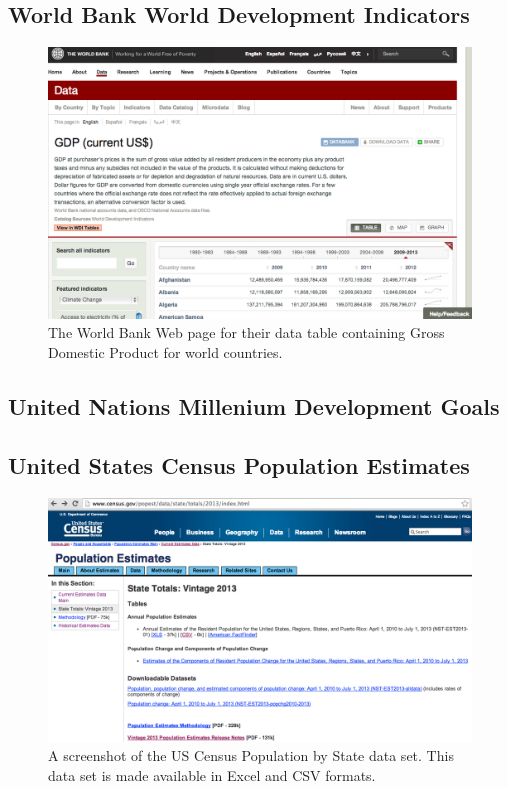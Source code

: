 \subsection{World Bank World Development Indicators}
\begin{figure}[h]
  \caption{The World Bank Web page for their data table containing Gross Domestic Product for world countries.}
  \centering
  \includegraphics[width=\textwidth]{figures/worldBankGDP.png}
\end{figure}
\subsection{United Nations Millenium Development Goals}
\subsection{United States Census Population Estimates}
\begin{figure}[h]
  \caption{A screenshot of the US Census Population by State data set. This data set is made available in Excel and CSV formats.}
  \centering
  \includegraphics[width=\textwidth]{figures/usCensusPopulationByState.png}
\end{figure}

